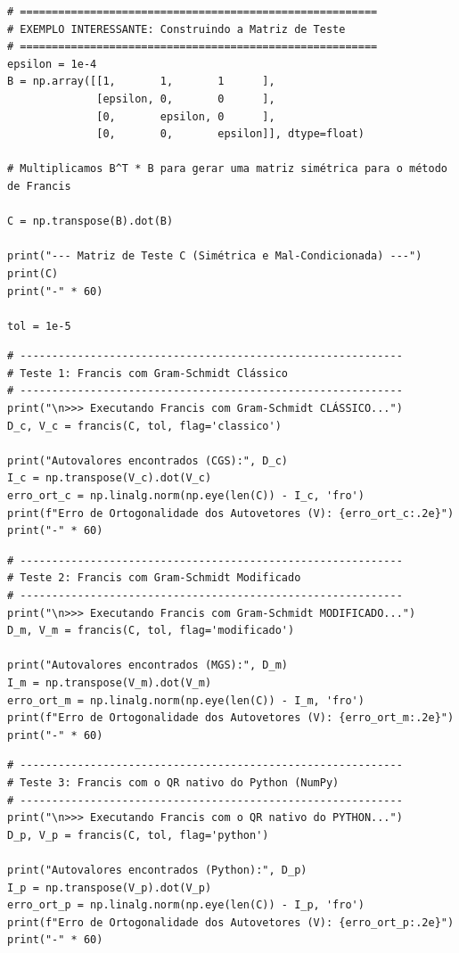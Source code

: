 \documentclass[../numerical_methods.tex]{subfiles}
\begin{document}
\begin{listing}[H]
	\begin{verbatim}
# ========================================================
# EXEMPLO INTERESSANTE: Construindo a Matriz de Teste
# ========================================================
epsilon = 1e-4
B = np.array([[1,       1,       1      ],
              [epsilon, 0,       0      ],
              [0,       epsilon, 0      ],
              [0,       0,       epsilon]], dtype=float)

# Multiplicamos B^T * B para gerar uma matriz simétrica para o método de Francis

C = np.transpose(B).dot(B)

print("--- Matriz de Teste C (Simétrica e Mal-Condicionada) ---")
print(C)
print("-" * 60)

tol = 1e-5

\end{verbatim}
	\begin{verbatim}
# ------------------------------------------------------------
# Teste 1: Francis com Gram-Schmidt Clássico
# ------------------------------------------------------------
print("\n>>> Executando Francis com Gram-Schmidt CLÁSSICO...")
D_c, V_c = francis(C, tol, flag='classico')

print("Autovalores encontrados (CGS):", D_c)
I_c = np.transpose(V_c).dot(V_c)
erro_ort_c = np.linalg.norm(np.eye(len(C)) - I_c, 'fro')
print(f"Erro de Ortogonalidade dos Autovetores (V): {erro_ort_c:.2e}")
print("-" * 60)
\end{verbatim}
\end{listing}
\begin{listing}[H]
	\begin{verbatim}
# ------------------------------------------------------------
# Teste 2: Francis com Gram-Schmidt Modificado
# ------------------------------------------------------------
print("\n>>> Executando Francis com Gram-Schmidt MODIFICADO...")
D_m, V_m = francis(C, tol, flag='modificado')

print("Autovalores encontrados (MGS):", D_m)
I_m = np.transpose(V_m).dot(V_m)
erro_ort_m = np.linalg.norm(np.eye(len(C)) - I_m, 'fro')
print(f"Erro de Ortogonalidade dos Autovetores (V): {erro_ort_m:.2e}")
print("-" * 60)
\end{verbatim}
	\begin{verbatim}
# ------------------------------------------------------------
# Teste 3: Francis com o QR nativo do Python (NumPy)
# ------------------------------------------------------------
print("\n>>> Executando Francis com o QR nativo do PYTHON...")
D_p, V_p = francis(C, tol, flag='python')

print("Autovalores encontrados (Python):", D_p)
I_p = np.transpose(V_p).dot(V_p)
erro_ort_p = np.linalg.norm(np.eye(len(C)) - I_p, 'fro')
print(f"Erro de Ortogonalidade dos Autovetores (V): {erro_ort_p:.2e}")
print("-" * 60)
\end{verbatim}
\end{listing}
\end{document}
